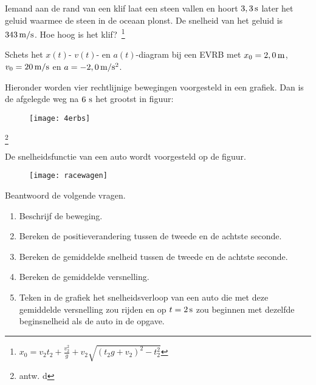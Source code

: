 \documentclass{ximera}
\begin{document}
\begin{exercise} Iemand aan de rand van een klif laat een steen vallen en hoort
$3,3\rm\,s$ later het geluid waarmee de steen in de oceaan plonst.
De snelheid van het geluid is $343\rm\,m/s$. Hoe hoog is het
klif?~\footnote{$x_0=v_2t_2+\frac{v_2^2}{g}+v_2\sqrt{(t_2g+v_2)^2-t_2^2}$}


\end{exercise}

\begin{exercise} Schets het $x(t)$- $v(t)$- en $a(t)$-diagram bij een EVRB met $x_0=2,0\rm\,m$, $v_0=20\rm\,m/s$ en $a=-2,0\rm\,m/s^2$.

\end{exercise}

\begin{exercise} Hieronder worden vier rechtlijnige bewegingen voorgesteld in een grafiek. Dan is de afgelegde weg na $6~\rm s$ het grootst in figuur:
\begin{figure}[h]
\begin{center}
\texttt{[image: 4erbs]}
\end{center}
\end{figure}
\footnote{antw. d}


\end{exercise}

\begin{exercise} De snelheidsfunctie van een auto wordt voorgesteld op de figuur. 
\begin{figure}[h]
\centering
\texttt{[image: racewagen]}
\end{figure}
\newline
Beantwoord de volgende vragen.
\begin{enumerate}
\item Beschrijf de beweging. 
\item Bereken de positieverandering tussen de tweede en de achtste seconde. 
\item Bereken de gemiddelde snelheid tussen de tweede en de achtste seconde. 
\item Bereken de gemiddelde versnelling. 
\item Teken in de grafiek het snelheidsverloop van een auto die met deze gemiddelde versnelling
zou rijden en op $t=2\rm\,s$ zou beginnen met dezelfde beginsnelheid als de auto in de opgave.
\end{enumerate}



\end{exercise}
\end{document}
